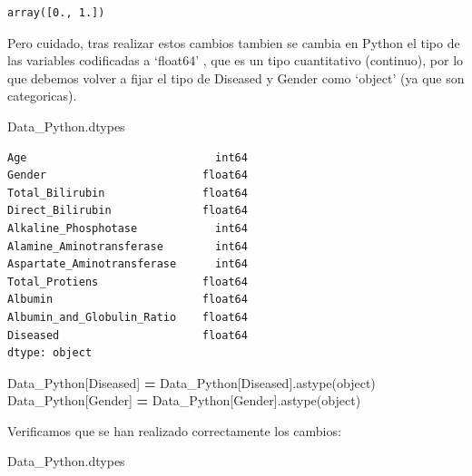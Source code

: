 \documentclass[
  11pt,
  a4paper,
]{article}
\newenvironment{Shaded}{\begin{snugshade}}{\end{snugshade}}
\newcommand{\NormalTok}[1]{#1}
\newcommand{\OperatorTok}[1]{\textcolor[rgb]{0.81,0.36,0.00}{\textbf{#1}}}
\newcommand{\StringTok}[1]{\textcolor[rgb]{0.31,0.60,0.02}{#1}}
\begin{document}
\begin{verbatim}
array([0., 1.])
\end{verbatim}

Pero cuidado, tras realizar estos cambios tambien se cambia en Python el
tipo de las variables codificadas a `float64' , que es un tipo
cuantitativo (continuo), por lo que debemos volver a fijar el tipo de
Diseased y Gender como `object' (ya que son categoricas).

\begin{Shaded}
\begin{Highlighting}[]
\NormalTok{Data\_Python.dtypes}
\end{Highlighting}
\end{Shaded}

\begin{verbatim}
Age                             int64
Gender                        float64
Total_Bilirubin               float64
Direct_Bilirubin              float64
Alkaline_Phosphotase            int64
Alamine_Aminotransferase        int64
Aspartate_Aminotransferase      int64
Total_Protiens                float64
Albumin                       float64
Albumin_and_Globulin_Ratio    float64
Diseased                      float64
dtype: object
\end{verbatim}

\begin{Shaded}
\begin{Highlighting}[]
\NormalTok{Data\_Python[}\StringTok{\textquotesingle{}Diseased\textquotesingle{}}\NormalTok{] }\OperatorTok{=}\NormalTok{ Data\_Python[}\StringTok{\textquotesingle{}Diseased\textquotesingle{}}\NormalTok{].astype(}\StringTok{\textquotesingle{}object\textquotesingle{}}\NormalTok{)}
\NormalTok{Data\_Python[}\StringTok{\textquotesingle{}Gender\textquotesingle{}}\NormalTok{] }\OperatorTok{=}\NormalTok{ Data\_Python[}\StringTok{\textquotesingle{}Gender\textquotesingle{}}\NormalTok{].astype(}\StringTok{\textquotesingle{}object\textquotesingle{}}\NormalTok{)}
\end{Highlighting}
\end{Shaded}

\newpage

Verificamos que se han realizado correctamente los cambios:

\begin{Shaded}
\begin{Highlighting}[]
\NormalTok{Data\_Python.dtypes}
\end{Highlighting}
\end{Shaded}
\end{document}
